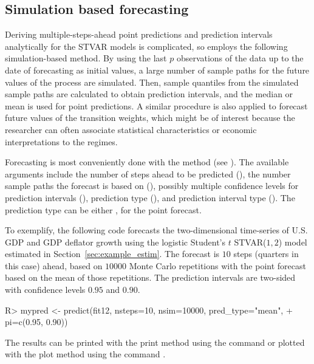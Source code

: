 \documentclass[nojss]{jss}
\begin{document}
\subsection{Simulation based forecasting}

Deriving multiple-steps-ahead point predictions and prediction intervals analytically for the STVAR models is complicated, so  employs the following simulation-based method. By using the last $p$ observations of the data up to the date of forecasting as initial values, a large number of sample paths for the future values of the process are simulated. Then, sample quantiles from the simulated sample paths are calculated to obtain prediction intervals, and the median or mean is used for point predictions. A similar procedure is also applied to forecast future values of the transition weights, which might be of interest because the researcher can often associate statistical characteristics or economic interpretations to the regimes.

Forecasting is most conveniently done with the  method (see ). The available arguments include the number of steps ahead to be predicted (), the number sample paths the forecast is based on (), possibly multiple confidence levels for prediction intervals (), prediction type (), and prediction interval type (). The prediction type can be either ,  for the point forecast.

To exemplify, the following code forecasts the two-dimensional time-series of U.S. GDP and GDP deflator growth using the logistic Student's $t$ STVAR($1, 2$) model  estimated in Section~\ref{sec:example_estim}. The forecast is $10$ steps (quarters in this case) ahead, based on $10000$ Monte Carlo repetitions with the point forecast based on the mean of those repetitions. The prediction intervals are two-sided with confidence levels $0.95$ and $0.90$.
%
\begin{CodeChunk}
\begin{CodeInput}
R> mypred <- predict(fit12, nsteps=10, nsim=10000, pred_type="mean",
+    pi=c(0.95, 0.90))
\end{CodeInput}
\end{CodeChunk}
%
The results can be printed with the print method using the command  or plotted with the plot method using the command .
\end{document}

